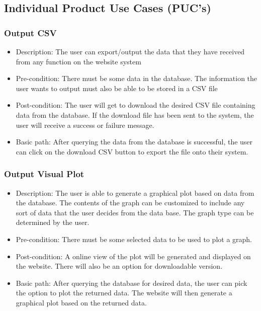 \documentclass[12pt]{article}
\begin{document}
\newpage  \subsection{Individual Product Use Cases (PUC's)}
\subsubsection{Output CSV}
\begin{itemize}
  \item Description: The user can export/output the data that they have received
  from any function on the website system
  \item Pre-condition: There must be some data in the database. The information
  the user wants to output must also be able to be stored in a CSV file 
  \item Post-condition: The user will get to download the desired CSV file
  containing data from the database. If the download file has been sent to the
  system, the user will receive a success or failure message.
  \item Basic path: After querying the data from the database is successful, the
  user can click on the download CSV button to export the file onto their system.
\end{itemize}

\subsubsection{Output Visual Plot}
\begin{itemize}
  \item Description: The user is able to generate a graphical plot based on data
  from the database. The contents of the graph can be customized to include any
  sort of data that the user decides from the data base. The graph type can be determined by the user. 
  \item Pre-condition: There must be some selected data to be used to plot a graph.
  \item Post-condition: A online view of the plot will be generated and
  displayed on the website. There will also be an option for downloadable version. 
  \item Basic path: After querying the database for desired data, the user can
  pick the option to plot the returned data. The website will then generate a
  graphical plot based on the returned data.
\end{itemize}
\end{document}
